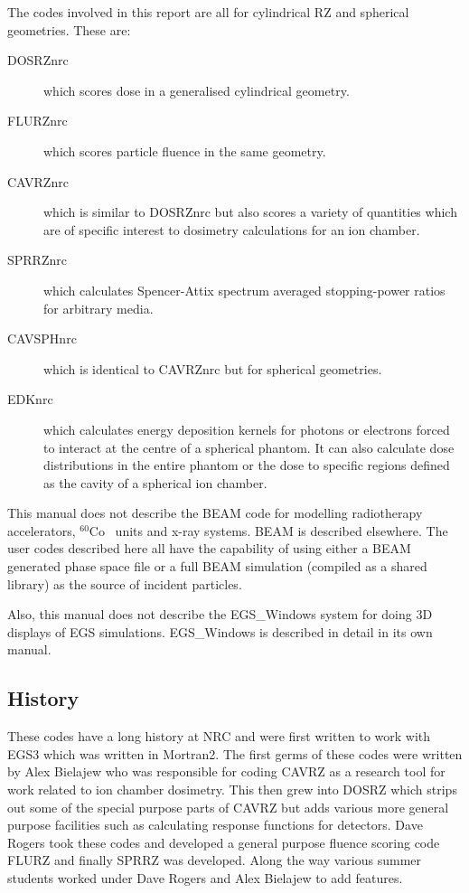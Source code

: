\documentclass[12pt,twoside]{article}  %
\newcommand{\Co}{$^{60}$Co}
\begin{document}
The codes involved in this report are all for
cylindrical RZ and spherical geometries. These are:
\begin{description}

\item[DOSRZnrc] which scores dose in a generalised cylindrical geometry.

\item[FLURZnrc] which scores particle fluence in the same geometry.

\item[CAVRZnrc] which is similar to DOSRZnrc but also scores a variety of
quantities which are of specific interest to dosimetry 
calculations for an ion chamber.

\item[SPRRZnrc] which calculates Spencer-Attix spectrum averaged
stopping-power ratios for arbitrary media.

\item[CAVSPHnrc] which is identical to CAVRZnrc but for spherical
geometries.

\item[EDKnrc] which calculates energy deposition kernels for photons
or electrons forced to interact at the centre of a spherical phantom.
It can also calculate dose distributions in the entire phantom or the
dose to specific regions defined as the cavity of a spherical ion chamber.

\end{description}

This manual does not describe the BEAM code for modelling radiotherapy
accelerators, \Co~ units and x-ray systems. BEAM is described
elsewhere\cite{Ro95,Ro98a}. The user codes
described here all have the capability of using either a BEAM generated phase
space file or a full BEAM simulation (compiled as a shared library)
as the source of incident particles.

Also, this manual does not describe the EGS\_Windows system for doing 3D
displays of EGS simulations. EGS\_Windows is described in detail in its own
manual\cite{TR99a}.

\subsection{History}
These codes have a long history at NRC and were first written to work
with EGS3 which was written in Mortran2.  The first germs of these
codes were written by Alex Bielajew who was responsible for coding
CAVRZ as a research tool for work related to ion chamber dosimetry.
This then grew into DOSRZ which strips out some of the special purpose
parts of CAVRZ but adds various more general purpose facilities such as
calculating response functions for detectors. Dave Rogers took these
codes and developed a general purpose fluence scoring code FLURZ and
finally SPRRZ was developed.  Along the way various summer students worked
under Dave Rogers and Alex Bielajew to add features. 
\end{document}
